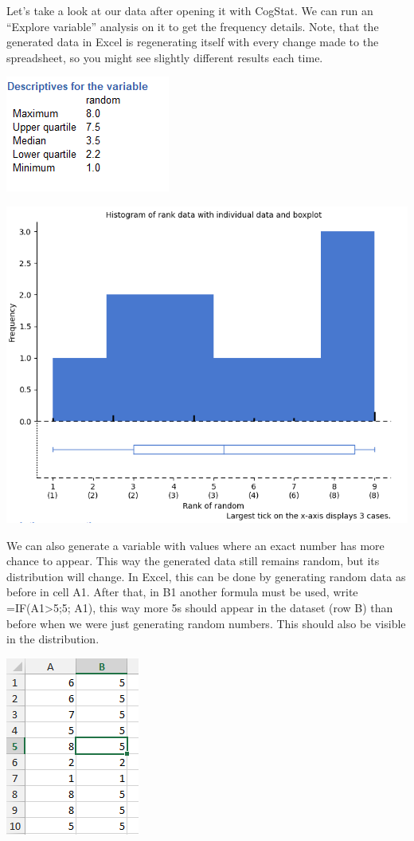 \documentclass[
]{book}
\begin{document}
Let's take a look at our data after opening it with CogStat. We can run an ``Explore variable'' analysis on it to get the frequency details. Note, that the generated data in Excel is regenerating itself with every change made to the spreadsheet, so you might see slightly different results each time.

\includegraphics{img/ch4/4.2descftv_random.png}

\includegraphics{img/ch4/4.2histogram_random.png}

We can also generate a variable with values where an exact number has more chance to appear. This way the generated data still remains random, but its distribution will change. In Excel, this can be done by generating random data as before in cell A1. After that, in B1 another formula must be used, write =IF(A1\textgreater5;5; A1), this way more 5s should appear in the dataset (row B) than before when we were just generating random numbers. This should also be visible in the distribution.

\includegraphics{img/ch4/morefives.png}
\end{document}

